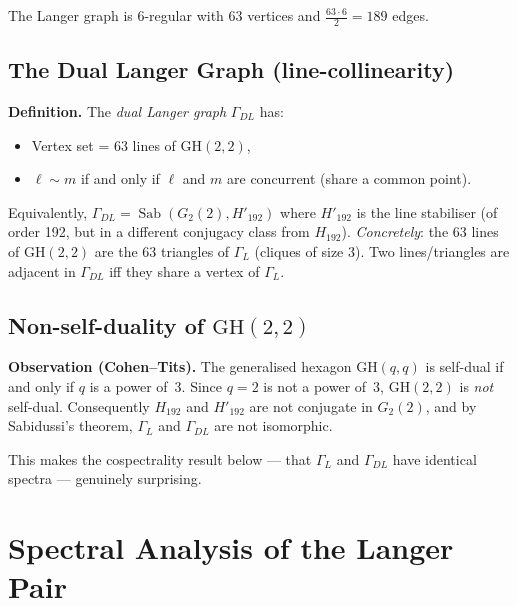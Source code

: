 \documentclass[11pt,a4paper]{article}
\theoremstyle{plain}
\theoremstyle{definition}
\newcommand{\Sab}{\operatorname{Sab}}
\newcommand{\GH}{\mathrm{GH}}
\begin{document}
The Langer graph is 6-regular with 63 vertices and $\frac{63 \cdot 6}{2} = 189$ edges.

\subsection{The Dual Langer Graph (line-collinearity)}

\begin{tcolorbox}[breakable, colback=green!8, colframe=green!8,
  boxrule=0pt, sharp corners]
\textbf{Definition.} The \emph{dual Langer graph} $\Gamma_{DL}$ has:
\begin{itemize}
\item Vertex set = 63 lines of $\GH(2,2)$,
\item $\ell \sim m$ if and only if $\ell$ and $m$ are concurrent
  (share a common point).
\end{itemize}
Equivalently, $\Gamma_{DL} = \Sab(G_2(2), H'_{192})$ where $H'_{192}$ is the
line stabiliser (of order 192, but in a different conjugacy class from $H_{192}$).
\emph{Concretely}: the 63 lines of $\GH(2,2)$ are the 63 triangles of $\Gamma_L$
(cliques of size 3). Two lines/triangles are adjacent in $\Gamma_{DL}$ iff they
share a vertex of $\Gamma_L$.
\end{tcolorbox}

\subsection{Non-self-duality of $\GH(2,2)$}

\begin{tcolorbox}[breakable, colback=yellow!12, colframe=yellow!12,
  boxrule=0pt, sharp corners]
\textbf{Observation (Cohen--Tits).} The generalised hexagon $\GH(q,q)$ is
self-dual if and only if $q$ is a power of~3. Since $q=2$ is not a power of~3,
$\GH(2,2)$ is \emph{not} self-dual. Consequently $H_{192}$ and $H'_{192}$ are
not conjugate in $G_2(2)$, and by Sabidussi's theorem, $\Gamma_L$ and
$\Gamma_{DL}$ are not isomorphic.

This makes the cospectrality result below --- that $\Gamma_L$ and $\Gamma_{DL}$
have identical spectra --- genuinely surprising.
\end{tcolorbox}

\section{Spectral Analysis of the Langer Pair}
\end{document}
